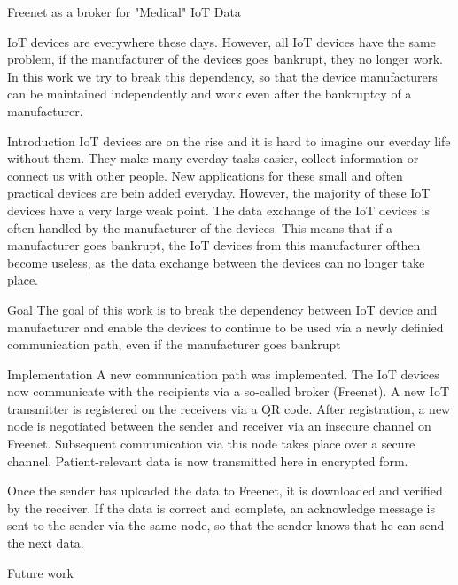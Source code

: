 
Freenet as a broker for "Medical" IoT Data


IoT devices are everywhere these days. However, all IoT devices have the same problem, if the manufacturer of the devices goes bankrupt, they no longer work. In this work we try to break this dependency, so that the device manufacturers can be maintained independently and work even after the bankruptcy of a manufacturer.



Introduction
IoT devices are on the rise and it is hard to imagine our everday life without them. They make many everday tasks easier, collect information or connect us with other people. New applications for these small and often practical devices are bein added everyday. However, the majority of these IoT devices have a very large weak point. The data exchange of the IoT devices is often handled by the manufacturer of the devices. This means that if a manufacturer goes bankrupt, the IoT devices from this manufacturer ofthen become useless, as the data exchange between the devices can no longer take place.



Goal
The goal of this work is to break the dependency between IoT device and manufacturer and enable the devices to continue to be used via a newly definied communication path, even if the manufacturer goes bankrupt



Implementation
A new communication path was implemented. The IoT devices now communicate with the recipients via a so-called broker (Freenet). A new IoT transmitter is registered on the receivers via a QR code. After registration, a new node is negotiated between the sender and receiver via an insecure channel on Freenet. Subsequent communication via this node takes place over a secure channel. Patient-relevant data is now transmitted here in encrypted form. 

Once the sender has uploaded the data to Freenet, it is downloaded and verified by the receiver. If the data is correct and complete, an acknowledge message is sent to the sender via the same node, so that the sender knows that he can send the next data.



Future work
